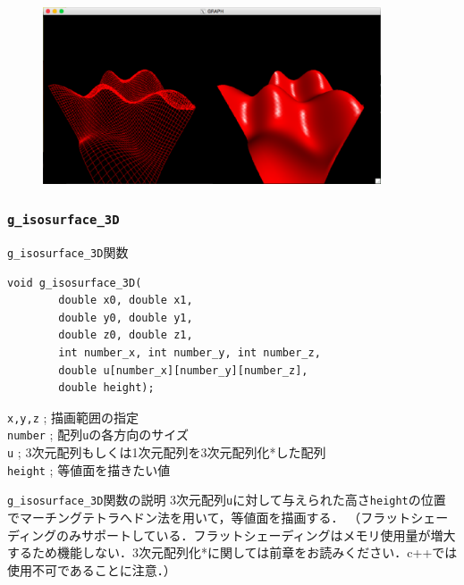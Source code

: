 \documentclass[platex,a4paper,12pt]{jsarticle}%
\begin{document}
\begin{figure}[htb]
\centering
	\includegraphics[width=100mm]{./Figures/eps/Canvas_g_bird_view.eps}
\end{figure}




\clearpage
\subsubsection{\texttt{g\_isosurface\_3D}}

\begin{itembox}[l]{\texttt{g\_isosurface\_3D}関数}
\begin{verbatim}
void g_isosurface_3D(
        double x0, double x1,
        double y0, double y1,        
        double z0, double z1,
        int number_x, int number_y, int number_z,
        double u[number_x][number_y][number_z],
        double height);
\end{verbatim}
\verb|x,y,z| ; 描画範囲の指定\\
\verb|number| ; 配列\verb|u|の各方向のサイズ\\
\verb|u| ; 3次元配列もしくは1次元配列を3次元配列化*した配列\\
\verb|height| ; 等値面を描きたい値
\end{itembox}

\begin{itembox}[l]{\texttt{g\_isosurface\_3D}関数の説明}
3次元配列\verb|u|に対して与えられた高さ\verb|height|の位置でマーチングテトラへドン法を用いて，等値面を描画する．
（フラットシェーディングのみサポートしている．フラットシェーディングはメモリ使用量が増大するため機能しない．3次元配列化*に関しては前章をお読みください．c++では使用不可であることに注意．）
\end{itembox}
\end{document}
